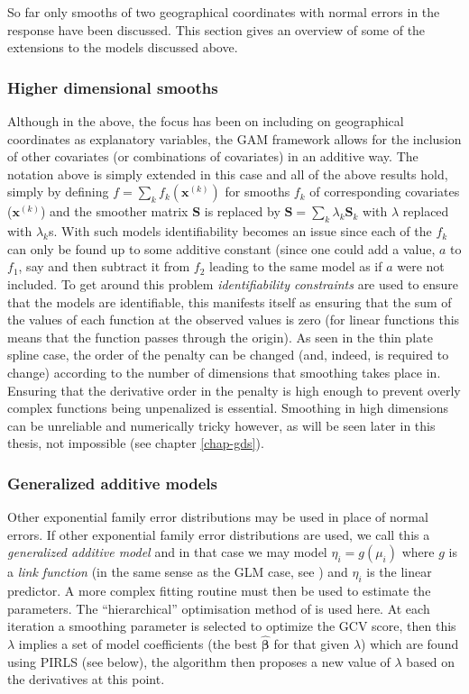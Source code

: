 So far only smooths of two geographical coordinates with normal errors in the response have been discussed. This section gives an overview of some of the extensions to the models discussed above.

\subsubsection{Higher dimensional smooths}

Although in the above, the focus has been on including on geographical coordinates as explanatory variables, the GAM framework allows for the inclusion of other covariates (or combinations of covariates) in an additive way. The notation above is simply extended in this case and all of the above results hold, simply by defining $f=\sum_k f_k(\mathbf{x}^{(k)})$ for smooths $f_k$ of corresponding covariates ($\mathbf{x}^{(k)}$) and the smoother matrix $\mathbf{S}$ is replaced by $\mathbf{S}= \sum_k \lambda_k \mathbf{S}_k$ with $\lambda$ replaced with $\lambda_k$s. With such models identifiability becomes an issue since each of the $f_k$ can only be found up to some additive constant (since one could add a value, $a$ to $f_1$, say and then subtract it from $f_2$ leading to the same model as if $a$ were not included. To get around this problem \textit{identifiability constraints} are used to ensure that the models are identifiable, this manifests itself as ensuring that the sum of the values of each function at the observed values is zero (for linear functions this means that the function passes through the origin). As seen in the thin plate spline case, the order of the penalty can be changed (and, indeed, is required to change) according to the number of dimensions that smoothing takes place in. Ensuring that the derivative order in the penalty is high enough to prevent overly complex functions being unpenalized is essential. Smoothing in high dimensions can be unreliable and numerically tricky however, as will be seen later in this thesis, not impossible (see chapter \ref{chap-gds}).

\subsubsection{Generalized additive models}
\label{intro-extending-gams}

Other exponential family error distributions may be used in place of normal errors. If other exponential family error distributions are used, we call this a \textit{generalized additive model} and in that case we may model $\eta_i=g(\mu_i)$ where $g$ is a \textit{link function} (in the same sense as the GLM case, see \cite[p. 8]{GEEbook}) and $\eta_i$ is the linear predictor. A more complex fitting routine must then be used to estimate the parameters. The ``hierarchical'' optimisation method of  is used here. At each iteration a smoothing parameter is selected to optimize the GCV score, then this $\lambda$ implies a set of model coefficients (the best $\bm{\hat{\beta}}$ for that given $\lambda$) which are found using PIRLS (see below), the algorithm then proposes a new value of $\lambda$ based on the derivatives at this point.


